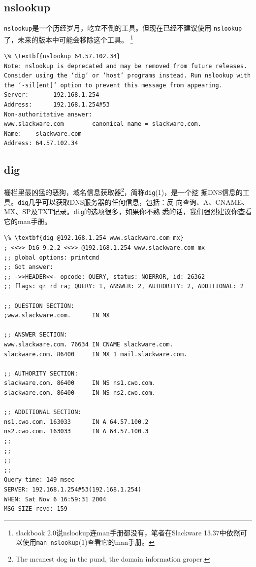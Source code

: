 \subsection{nslookup}
\label{chap:basicNetworkCommands:dnsTools:nslookup}
\texttt{nslookup}是一个历经岁月，屹立不倒的工具。但现在已经不建议使用
\texttt{nslookup}了，未来的版本中可能会移除这个工具。
\footnote{slackbook 2.0说nslookup连man手册都没有，笔者在Slackware
  13.37中依然可以使用\texttt{man nslookup}(1)查看它的man手册。}
\begin{Verbatim}[frame=single, commandchars=\\\{\}]
\% \textbf{nslookup 64.57.102.34}
Note: nslookup is deprecated and may be removed from future releases.
Consider using the ‘dig’ or ‘host’ programs instead. Run nslookup with
the ‘-sil[ent]’ option to prevent this message from appearing.
Server:       192.168.1.254
Address:      192.168.1.254#53
Non-authoritative answer:
www.slackware.com        canonical name = slackware.com.
Name:    slackware.com
Address: 64.57.102.34
\end{Verbatim}

\subsection{dig}
\label{chap:basicNetworkCommands:dnsTools:dig}
栅栏里最凶猛的恶狗，域名信息获取器\footnote{The meanest dog in the
  pund, the domain information groper.}，简称\texttt{dig}(1)，是一个挖
掘DNS信息的工具。\texttt{dig}几乎可以获取DNS服务器的任何信息，包括：反
向查询、A、CNAME、MX、SP及TXT记录。\texttt{dig}的选项很多，如果你不熟
悉的话，我们强烈建议你查看它的man手册。
\begin{Verbatim}[frame=single, commandchars=\\\{\}]
\% \textbf{dig @192.168.1.254 www.slackware.com mx}
; <<>> DiG 9.2.2 <<>> @192.168.1.254 www.slackware.com mx
;; global options: printcmd
;; Got answer:
;; ->>HEADER<<- opcode: QUERY, status: NOERROR, id: 26362
;; flags: qr rd ra; QUERY: 1, ANSWER: 2, AUTHORITY: 2, ADDITIONAL: 2

;; QUESTION SECTION:
;www.slackware.com.      IN MX

;; ANSWER SECTION:
www.slackware.com. 76634 IN CNAME slackware.com.
slackware.com. 86400     IN MX 1 mail.slackware.com.

;; AUTHORITY SECTION:
slackware.com. 86400     IN NS ns1.cwo.com.
slackware.com. 86400     IN NS ns2.cwo.com.

;; ADDITIONAL SECTION:
ns1.cwo.com. 163033      IN A 64.57.100.2
ns2.cwo.com. 163033      IN A 64.57.100.3
;;
;;
;;
;;
Query time: 149 msec
SERVER: 192.168.1.254#53(192.168.1.254)
WHEN: Sat Nov 6 16:59:31 2004
MSG SIZE rcvd: 159
\end{Verbatim}

